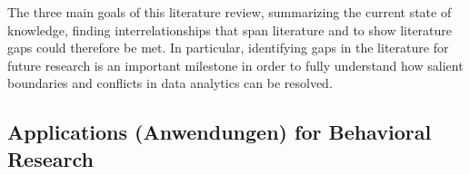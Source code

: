 The three main goals of this literature review, summarizing the current state of knowledge, finding interrelationships that span literature and to show literature gaps could therefore be met. In particular, identifying gaps in the literature for future research is an important milestone in order to fully understand how salient boundaries and conflicts in data analytics can be resolved.

\subsection{Applications (Anwendungen) for Behavioral Research}
